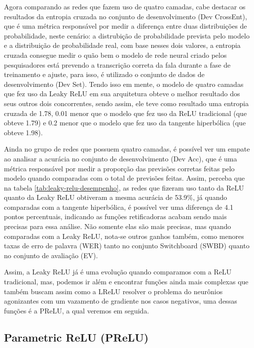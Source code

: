 \begin{table}[ht]
\begin{threeparttable}
    \end{threeparttable}
\end{table}

Agora comparando as redes que fazem uso de quatro camadas, cabe destacar os resultados da entropia cruzada no conjunto de desenvolvimento (Dev CrossEnt), que é uma métrica responsável por medir a diferença entre duas distribuições de probabilidade, neste cenário: a distrubição de probabilidade prevista pelo modelo e a distribuição de probabilidade real, com base nesses dois valores, a entropia cruzada consegue medir o quão bem o modelo de rede neural criado pelos pesquisadores está prevendo a transcrição correta da fala durante a fase de treinamento e ajuste, para isso, é utilizado o conjunto de dados de desenvolvimento (Dev Set). Tendo isso em mente, o modelo de quatro camadas que fez uso da Leaky ReLU em sua arquitetura obteve o melhor resultado dos seus outros dois concorrentes, sendo assim, ele teve como resultado uma entropia cruzada de 1.78, 0.01 menor que o modelo que fez uso da ReLU tradicional (que obteve 1.79) e 0.2 menor que o modelo que fez uso da tangente hiperbólica (que obteve 1.98).

Ainda no grupo de redes que possuem quatro camadas, é possível ver um empate ao analisar a acurácia no conjunto de desenvolvimento (Dev Acc), que é uma métrica responsável por medir a proporção das previsões corretas feitas pelo modelo quando comparadas com o total de previsões feitas. Assim, perceba que na tabela \ref{tab:leaky-relu-desempenho}, as redes que fizeram uso tanto da ReLU quanto da Leaky ReLU obtiveram a mesma acurácia de 53.9\%, já quando comparadas com a tangente hiperbólica, é possível ver uma diferença de 4.1 pontos percentuais, indicando as funções retificadoras acabam sendo mais precisas para essa análise. Não somente elas são mais precisas, mas quando comparadas com a Leaky ReLU, nota-se outros ganhos também, como menores taxas de erro de palavra (WER) tanto no conjunto Switchboard (SWBD) quanto no conjunto de avaliação (EV).

Assim, a Leaky ReLU já é uma evolução quando comparamos com a ReLU tradicional, mas, podemos ir além e encontrar funções ainda mais complexas que também buscam assim como a LReLU resolver o problema do neurônios agonizantes com um vazamento de gradiente nos casos negativos, uma dessas funções é a PReLU, a qual veremos em seguida.

\subsection{Parametric ReLU (PReLU)}

